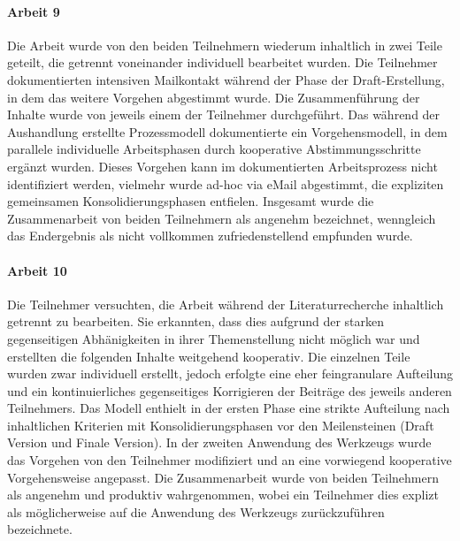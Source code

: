 
\paragraph{Arbeit 9} %
\label{par:arbeit_9}

Die Arbeit wurde von den beiden Teilnehmern wiederum inhaltlich in zwei Teile geteilt, die getrennt voneinander individuell bearbeitet wurden. Die Teilnehmer dokumentierten intensiven Mailkontakt während der Phase der Draft-Erstellung, in dem das weitere Vorgehen abgestimmt wurde. Die Zusammenführung der Inhalte wurde von jeweils einem der Teilnehmer durchgeführt. Das während der Aushandlung erstellte Prozessmodell dokumentierte ein Vorgehensmodell, in dem parallele individuelle Arbeitsphasen durch kooperative Abstimmungsschritte ergänzt wurden. Dieses Vorgehen kann im dokumentierten Arbeitsprozess nicht identifiziert werden, vielmehr wurde ad-hoc via eMail abgestimmt, die expliziten gemeinsamen Konsolidierungsphasen entfielen. Insgesamt wurde die Zusammenarbeit von beiden Teilnehmern als angenehm bezeichnet, wenngleich das Endergebnis als nicht vollkommen zufriedenstellend empfunden wurde.


\paragraph{Arbeit 10} %
\label{par:arbeit_10}

Die Teilnehmer versuchten, die Arbeit während der Literaturrecherche inhaltlich getrennt zu bearbeiten. Sie erkannten, dass dies aufgrund der starken gegenseitigen Abhänigkeiten in ihrer Themenstellung nicht möglich war und erstellten die folgenden Inhalte weitgehend kooperativ. Die einzelnen Teile wurden zwar individuell erstellt, jedoch erfolgte eine eher feingranulare Aufteilung und ein kontinuierliches gegenseitiges Korrigieren der Beiträge des jeweils anderen Teilnehmers. Das Modell enthielt in der ersten Phase eine strikte Aufteilung nach inhaltlichen Kriterien mit Konsolidierungsphasen vor den Meilensteinen (Draft Version und Finale Version). In der zweiten Anwendung des Werkzeugs wurde das Vorgehen von den Teilnehmer modifiziert und an eine vorwiegend kooperative Vorgehensweise angepasst. Die Zusammenarbeit wurde von beiden Teilnehmern als angenehm und produktiv wahrgenommen, wobei ein Teilnehmer dies explizt als möglicherweise auf die Anwendung des Werkzeugs zurückzuführen bezeichnete.

